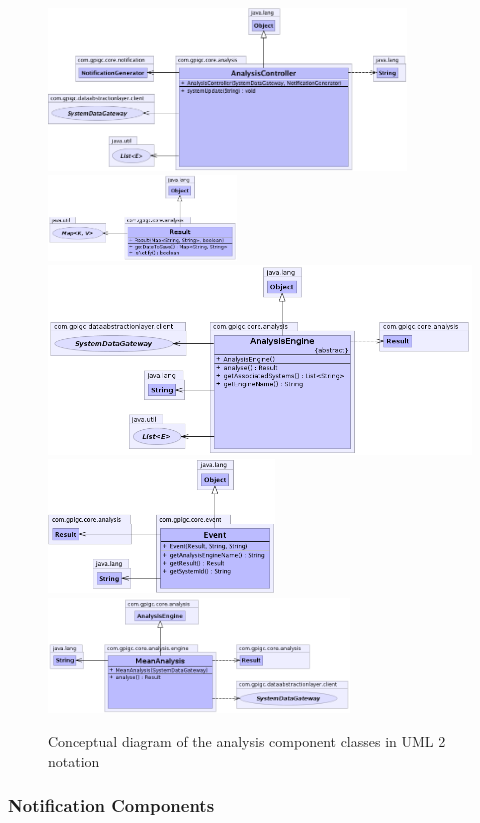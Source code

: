\documentclass[10pt,a4paper]{article}
\begin{document}
\begin{figure}[h!]
  \centering
  \includegraphics[width= 9.5cm]{images/Analysis/AnalysisController.png}
  \includegraphics[width= 5cm]{images/Analysis/Result.png}
  \includegraphics[width= 12cm]{images/Analysis/AnalysisEngine.png}
  \includegraphics[width= 6cm]{images/Analysis/Event.png}
  \includegraphics[width= 8cm]{images/Analysis/MeanAnalysis.png}
  \caption{Conceptual diagram of the analysis component classes in
UML 2 notation}
  \label{fig:dataAnalysisComponent}
\end{figure}

\subsubsection*{Notification Components}
\end{document}
